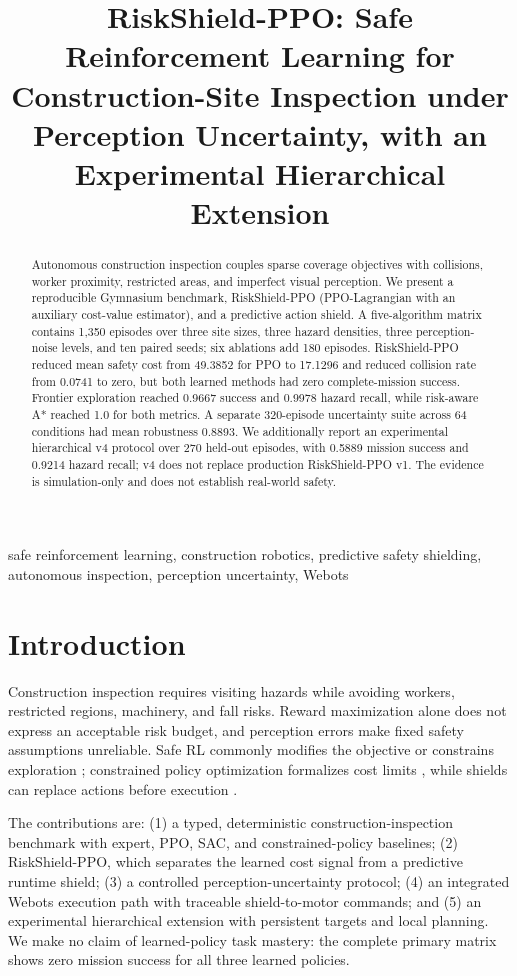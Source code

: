 \documentclass[conference]{IEEEtran}
\title{RiskShield-PPO: Safe Reinforcement Learning for Construction-Site Inspection under Perception Uncertainty, with an Experimental Hierarchical Extension}
\author{\IEEEauthorblockN{Mahmoud Maher}}
\begin{document}
\maketitle

\begin{IEEEkeywords}
safe reinforcement learning, construction robotics, predictive safety
shielding, autonomous inspection, perception uncertainty, Webots
\end{IEEEkeywords}

\begin{abstract}
Autonomous construction inspection couples sparse coverage objectives with
collisions, worker proximity, restricted areas, and imperfect visual
perception. We present a reproducible Gymnasium benchmark, RiskShield-PPO
(PPO-Lagrangian with an auxiliary cost-value estimator), and a predictive
action shield. A five-algorithm matrix contains 1,350 episodes over three site
sizes, three hazard densities, three perception-noise levels, and ten paired
seeds; six ablations add 180 episodes. RiskShield-PPO reduced mean safety cost
from 49.3852 for PPO to 17.1296 and reduced collision rate from 0.0741 to zero,
but both learned methods had zero complete-mission success. Frontier
exploration reached 0.9667 success and 0.9978 hazard recall, while risk-aware
A* reached 1.0 for both metrics. A separate 320-episode uncertainty suite
across 64 conditions had mean robustness 0.8893. We additionally report an
experimental hierarchical v4 protocol over 270 held-out episodes, with 0.5889
mission success and 0.9214 hazard recall; v4 does not replace production
RiskShield-PPO v1. The evidence is simulation-only and does not establish
real-world safety.
\end{abstract}

\section{Introduction}
Construction inspection requires visiting hazards while avoiding workers,
restricted regions, machinery, and fall risks. Reward maximization alone does
not express an acceptable risk budget, and perception errors make fixed safety
assumptions unreliable. Safe RL commonly modifies the objective or constrains
exploration \cite{garcia2015safe}; constrained policy optimization formalizes
cost limits \cite{achiam2017cpo}, while shields can replace actions before
execution \cite{alshiekh2018shielding}.

The contributions are: (1) a typed, deterministic construction-inspection
benchmark with expert, PPO, SAC, and constrained-policy baselines; (2)
RiskShield-PPO, which separates the learned cost signal from a predictive
runtime shield; (3) a controlled perception-uncertainty protocol; (4) an
integrated Webots execution path with traceable shield-to-motor commands; and
(5) an experimental hierarchical extension with persistent targets and local
planning. We make no claim of learned-policy task mastery: the complete
primary matrix shows zero mission success for all three learned policies.
\end{document}

